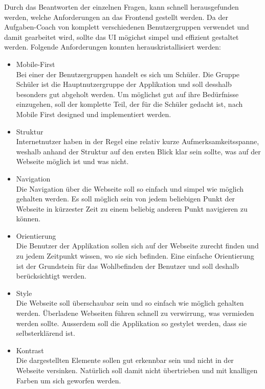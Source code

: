 Durch das Beantworten der einzelnen Fragen, kann schnell herausgefunden werden, welche Anforderungen an das Frontend gestellt werden. Da der Aufgaben-Coach von komplett verschiedenen Benutzergruppen verwendet und damit gearbeitet wird, sollte das UI mögichst simpel und effizient gestaltet werden. Folgende Anforderungen konnten herauskristallisiert werden:

\begin{itemize}
	\item Mobile-First \\
		Bei einer der Benutzergruppen handelt es sich um Schüler. Die Gruppe Schüler ist die Hauptnutzergruppe der Applikation und soll desshalb besonders gut abgeholt werden. Um möglichst gut auf ihre Bedürfnisse einzugehen, soll der komplette Teil, der für die Schüler gedacht ist, nach Mobile First designed und implementiert werden.
		
	\item Struktur \\
		Internetnutzer haben in der Regel eine relativ kurze Aufmerksamkeitsspanne, weshalb anhand der Struktur auf den ersten Blick klar sein sollte, was auf der Webseite möglich ist und was nicht. 
		
	\item Navigation \\
		Die Navigation über die Webseite soll so einfach und simpel wie möglich gehalten werden. Es soll möglich sein von jedem beliebigen Punkt der Webseite in kürzester Zeit zu einem beliebig anderen Punkt navigieren zu können.
		
	
	\item Orientierung \\
		Die Benutzer der Applikation sollen sich auf der Webseite zurecht finden und zu jedem Zeitpunkt wissen, wo sie sich befinden. Eine einfache Orientierung ist der Grundstein für das Wohlbefinden der Benutzer und soll deshalb berücksichtigt werden.
		
	\item Style \\
		Die Webseite soll überschaubar sein und so einfach wie möglich gehalten werden. Überladene Webseiten führen schnell zu verwirrung, was vermieden werden sollte. Ausserdem soll die Applikation so gestylet werden, dass sie selbsterklärend ist.
		
	\item Kontrast \\
		Die dargestellten Elemente sollen gut erkennbar sein und nicht in der Webseite versinken. Natürlich soll damit nicht übertrieben und mit knalligen Farben um sich geworfen werden.
\end{itemize}

